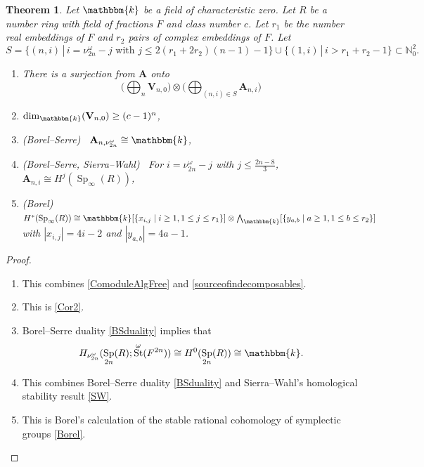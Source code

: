 \documentclass[11pt,letterpaper]{amsart}
\newcommand{\bk}{\mathbbm{k}}
\DeclareMathOperator{\Sp}{Sp}
\newcommand{\VV}{\mathbf{V}}
\newcommand{\HA}{\mathbf{A}}
\newcommand{\N}{\mathbb{N}_0}
\numberwithin{theoremcounter}{section}
\newtheorem{theorem}[theoremauto]{Theorem}
\theoremstyle{definition}
\theoremstyle{remark}
\DeclareMathOperator{\St}{St}
\begin{document}
\begin{theorem} \label{corClassNumberBetter}
Let $\bk$ be a field of characteristic zero. Let $R$ be a number ring with field of fractions $F$ and class number $c$. Let $r_1$ be the number real embeddings of $F$ and $r_2$ pairs of complex embeddings of $F$.
Let $$S=\{(n,i) \,| \, i= \nu_{2n}^{\omega} -j \text{ with } j \leq 2(r_1+2r_2)(n-1)-1 \} \cup \{(1,i) \, | \, i > r_1+r_2-1  \} \subset \N^2.$$ 
\begin{enumerate}
    \item 
  There is a surjection from $\HA$ onto  $$ \Big( \bigoplus_n \VV_{n,0} \Big) \otimes \Big( \bigoplus_{(n,i) \in S} \HA_{n,i} \Big) $$ 

  \item  $\dim_\bk (\VV_{n,0}) \geq (c-1)^n$,
    \item (Borel--Serre) \, $\HA_{n,\nu^\omega_{2n}} \cong \bk$,
  \item (Borel--Serre, Sierra--Wahl) \, For $i = \nu_{2n}^\omega - j $ with $j \leq \frac{2n-8}{3}$, $\HA_{n,i} \cong H^j(\Sp_\infty(R ))$,
  \item (Borel) \, $H^*(\Sp_\infty(R)) \cong  \bk[\{x_{i,j} \mid i\ge 1, 1\le j \le r_1\}] \otimes {\bigwedge}_{\bk}[\{y_{a,b}\mid a\ge 1, 1\le b \le r_2 \}]$ with $|x_{i,j}|=4i-2$ and $|y_{a,b}|=4a-1$.
\end{enumerate}
   

    
\end{theorem}

\begin{proof}
\begin{enumerate}

    \item This combines \autoref{ComoduleAlgFree} and \autoref{sourceofindecomposables}.
    \item This is \autoref{Cor2}.
    \item Borel--Serre duality \autoref{BSduality} implies  that $$H_{\nu^\omega_{2n}}(\Sp_{2n}(R);\St^\omega(F^{2n})) \cong H^0(\Sp_{2n}(R)) \cong \bk.$$
    \item This combines Borel--Serre duality \autoref{BSduality} and Sierra–Wahl's homological stability result \autoref{SW}. 
    \item This is Borel's calculation of the stable rational cohomology of symplectic groups \autoref{Borel}.
\end{enumerate}
\end{proof}
\end{document}

